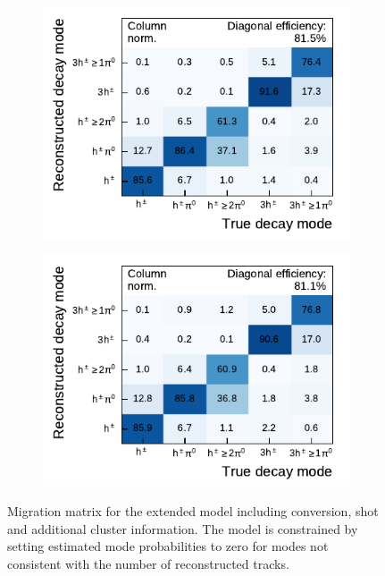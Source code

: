 \begin{figure}[htbp]
  \begin{subfigure}{0.48\textwidth}
    \centering
    \includegraphics{./figures/decay_mode_classification/combined_sub_e_moments_shots_conv_ptcut_1_5/mig_mat.pdf}
  \end{subfigure}\hfill
  \begin{subfigure}{0.48\textwidth}
    \centering
    \includegraphics{./figures/decay_mode_classification/combined_sub_e_moments_shots_conv_ptcut_1_5/mig_mat_use_ntracks.pdf}
  \end{subfigure}
  \caption{Migration matrix for the extended model including conversion, shot
    and additional cluster information. The model is constrained by setting
    estimated mode probabilities to zero for modes not consistent with the
    number of reconstructed tracks.}
\end{figure}


